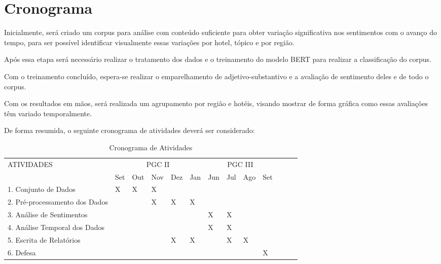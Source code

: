 \chapter{Cronograma}
\label{cap:cronograma}


Inicialmente, será criado um corpus para análise com conteúdo suficiente para obter variação significativa nos sentimentos com o avanço do tempo, para ser possível identificar visualmente essas variações por hotel, tópico e por região.

Após essa etapa será necessário realizar o tratamento dos dados e o treinamento do modelo BERT para realizar a classificação do corpus.

Com o treinamento concluído, espera-se realizar o emparelhamento de adjetivo-substantivo e a avaliação de sentimento deles e de todo o corpus.

Com os resultados em mãos, será realizada um agrupamento por região e hotéis, visando mostrar de forma gráfica como essas avaliações têm variado temporalmente.

De forma resumida, o seguinte cronograma de atividades deverá ser considerado:

\begin{table}[H]
    \centering
    {\footnotesize
    \begin{tabular}{|p{6.1cm}|l|l|l|l|l|l|l|l|l|l|l|l|}
    \hline
    \multirow{2}{*}{ATIVIDADES} & \multicolumn{5}{c|}{PGC II} & \multicolumn{4}{c|}{PGC III}\\ \cline{2-10}
                                           &Set&Out&Nov&Dez&Jan&Jun&Jul&Ago&Set \\ \hline
    1. Conjunto de Dados                   & X & X & X &   &   &   &   &   &    \\ \hline
    2. Pré-processamento dos Dados         &   &   & X & X & X &   &   &   &    \\ \hline
    3. Análise de Sentimentos              &   &   &   &   &   & X & X &   &    \\ \hline
    4. Análise Temporal dos Dados          &   &   &   &   &   & X & X &   &    \\ \hline
    5. Escrita de Relatórios               &   &   &   & X & X &   & X & X &    \\ \hline
    6. Defesa                              &   &   &   &   &   &   &   &   & X  \\ \hline
    \end{tabular}}
    \caption{Cronograma de Atividades}
    \label{tab:cronograma}
\end{table}

